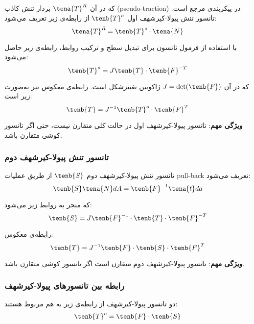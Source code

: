 که در آن $\tena{T}^R$ بردار تنش کاذب (pseudo-traction) در پیکربندی مرجع است. تانسور تنش پیولا-کیرشهف اول $\tenb{T}^o$ از رابطه‌ی زیر تعریف می‌شود:
\begin{equation}
	\tena{T}^R = \tenb{T}^o \cdot \tena{N}
\end{equation}

با استفاده از فرمول نانسون برای تبدیل سطح و ترکیب روابط، رابطه‌ی زیر حاصل می‌شود:
\begin{equation}
	\tenb{T}^o = J \tenb{T} \cdot \tenb{F}^{-T}
\end{equation}

که در آن $J = \det(\tenb{F})$ ژاکوبین تغییرشکل است. رابطه‌ی معکوس نیز به‌صورت زیر است:
\begin{equation}
	\tenb{T} = J^{-1} \tenb{T}^o \cdot \tenb{F}^T
\end{equation}

\textbf{ویژگی مهم}: تانسور پیولا-کیرشهف اول در حالت کلی متقارن نیست، حتی اگر تانسور کوشی متقارن باشد.

\subsubsection{تانسور تنش پیولا-کیرشهف دوم}

تانسور تنش پیولا-کیرشهف دوم $\tenb{S}$ از طریق عملیات pull-back تعریف می‌شود:
\begin{equation}
	\tenb{S} \tena{N} dA = \tenb{F}^{-1} \tena{t} da
\end{equation}

که منجر به روابط زیر می‌شود:
\begin{equation}
	\tenb{S} = J \tenb{F}^{-1} \cdot \tenb{T} \cdot \tenb{F}^{-T}
\end{equation}

رابطه‌ی معکوس:
\begin{equation}
	\tenb{T} = J^{-1} \tenb{F} \cdot \tenb{S} \cdot \tenb{F}^T
\end{equation}

\textbf{ویژگی مهم}: تانسور پیولا-کیرشهف دوم متقارن است اگر تانسور کوشی متقارن باشد.

\subsubsection{رابطه بین تانسورهای پیولا-کیرشهف}

دو تانسور پیولا-کیرشهف از رابطه‌ی زیر به هم مربوط هستند:
\begin{equation}
	\tenb{T}^o = \tenb{F} \cdot \tenb{S}
\end{equation}

